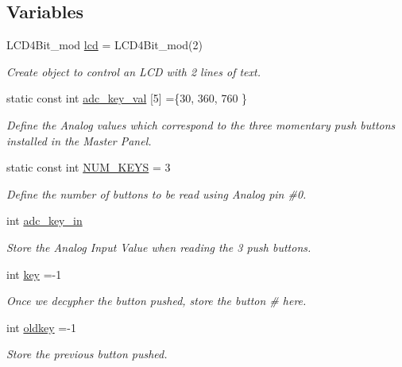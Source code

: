 \subsection*{Variables}
\begin{DoxyCompactItemize}
\item 
L\+C\+D4\+Bit\+\_\+mod \hyperlink{masterPanel_8ino_a41dddf59ae53b20320d0abf3498a563f}{lcd} = L\+C\+D4\+Bit\+\_\+mod(2)
\begin{DoxyCompactList}\small\item\em Create object to control an L\+CD with 2 lines of text. \end{DoxyCompactList}\item 
static const int \hyperlink{masterPanel_8ino_a3825b3540381c5eacce025d7c96ec83a}{adc\+\_\+key\+\_\+val} \mbox{[}5\mbox{]} =\{30, 360, 760 \}
\begin{DoxyCompactList}\small\item\em Define the Analog values which correspond to the three momentary push buttons installed in the Master Panel. \end{DoxyCompactList}\item 
static const int \hyperlink{masterPanel_8ino_a872c8b81f62c5a5afb73ba8e93422e1c}{N\+U\+M\+\_\+\+K\+E\+YS} = 3
\begin{DoxyCompactList}\small\item\em Define the number of buttons to be read using Analog pin \#0. \end{DoxyCompactList}\item 
int \hyperlink{masterPanel_8ino_a0cea6186dd3e0885b2ab52d918f062ad}{adc\+\_\+key\+\_\+in}
\begin{DoxyCompactList}\small\item\em Store the Analog Input Value when reading the 3 push buttons. \end{DoxyCompactList}\item 
int \hyperlink{masterPanel_8ino_a35af0be900467fedbb610bd6ea65ed78}{key} =-\/1
\begin{DoxyCompactList}\small\item\em Once we decypher the button pushed, store the button \# here. \end{DoxyCompactList}\item 
int \hyperlink{masterPanel_8ino_ab3d48dbe76030874dd18eb3c6780330e}{oldkey} =-\/1
\begin{DoxyCompactList}\small\item\em Store the previous button pushed. \end{DoxyCompactList}\item 

\end{DoxyCompactItemize}
